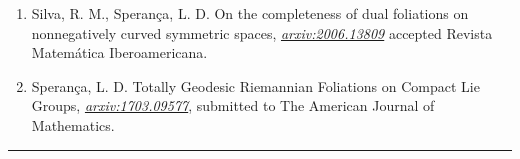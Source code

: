 \documentclass[10pt]{article}
\renewcommand{\section}[2]%
        {\pagebreak[2]\vspace{.2\baselineskip}%
         \phantomsection\addcontentsline{toc}{section}{#1}%
         \hspace{0in}%
         \marginpar{
         \raggedright \scshape #1}#2}
\begin{document}
\begin{enumerate}
		\item Silva, R. M., Sperança, L. D. On the completeness of dual foliations on nonnegatively curved symmetric spaces, \textit{\href{https://arxiv.org/abs/2006.13809}{arxiv:2006.13809}} accepted Revista Matemática Iberoamericana.
		
	\item Sperança, L. D. Totally Geodesic Riemannian Foliations on Compact Lie Groups, \textit{\href{https://arxiv.org/abs/1703.09577}{arxiv:1703.09577}}, submitted to The American Journal of Mathematics.
	
%	
	
	
	

\end{enumerate}

\rule{\columnwidth}{.5pt}%


%
%
%
\end{document}
